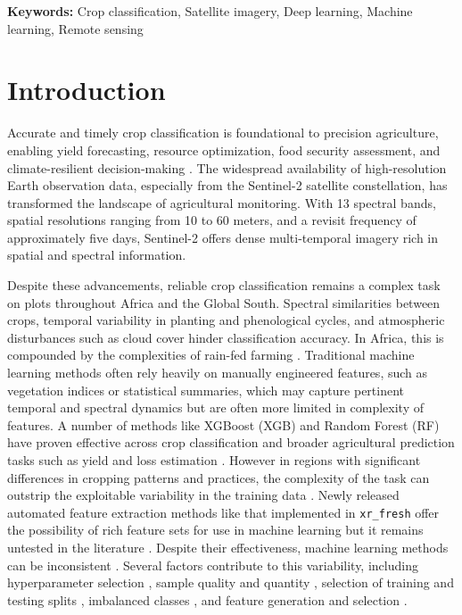 \documentclass[pdflatex,sn-mathphys]{sn-jnl} %
\begin{document}
\vspace{1em}
\noindent\textbf{Keywords:} Crop classification, Satellite imagery, Deep learning, Machine learning, Remote sensing

\section{Introduction}

Accurate and timely crop classification is foundational to precision agriculture, enabling yield forecasting, resource optimization, food security assessment, and climate-resilient decision-making \cite{begue2020, ieee2017}. The widespread availability of high-resolution Earth observation data, especially from the Sentinel-2 satellite constellation, has transformed the landscape of agricultural monitoring. With 13 spectral bands, spatial resolutions ranging from 10 to 60 meters, and a revisit frequency of approximately five days, Sentinel-2 offers dense multi-temporal imagery rich in spatial and spectral information.

Despite these advancements, reliable crop classification remains a complex task on plots throughout Africa and the Global South. Spectral similarities between crops, temporal variability in planting and phenological cycles, and atmospheric disturbances such as cloud cover hinder classification accuracy. In Africa, this is compounded by the complexities of rain-fed farming \cite{begue2020}. Traditional machine learning methods often rely heavily on manually engineered features, such as vegetation indices or statistical summaries, which may capture pertinent temporal and spectral dynamics but are often more limited in complexity of features. A number of methods like XGBoost (XGB) and Random Forest (RF) have proven effective across crop classification and broader agricultural prediction tasks such as yield and loss estimation \cite{mahlayeye2024, mann2023, mann2017, mann2019}. However in regions with significant differences in cropping patterns and practices, the complexity of the task can outstrip the exploitable variability in the training data \cite{mann2025, mahlayeye2024}. Newly released automated feature extraction methods like that implemented in \texttt{xr\_fresh} offer the possibility of rich feature sets for use in machine learning but it remains untested in the literature \cite{mann2025}. Despite their effectiveness, machine learning methods can be inconsistent \cite{maxwell2019}. Several factors contribute to this variability, including hyperparameter selection \cite{saini2018}, sample quality and quantity \cite{jin2019}, selection of training and testing splits \cite{belgiu2016}, imbalanced classes \cite{belgiu2016}, and feature generation and selection \cite{penabarragan2011}.  
\end{document}
